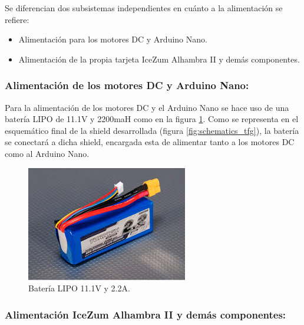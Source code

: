 Se diferencian dos subsistemas independientes en cuánto a la alimentación se refiere:
\begin{itemize}
	\item Alimentación para los motores DC y Arduino Nano.
	\item Alimentación de la propia tarjeta IceZum Alhambra II y demás componentes.
\end{itemize}

\subsubsection{Alimentación de los motores DC y Arduino Nano:}
Para la alimentación de los motores DC y el Arduino Nano se hace uso de una batería LIPO de 11.1V y 2200maH como en la figura \ref{fig:lipo111}. Como se representa en el esquemático final de la shield desarrollada (figura \ref{fig:schematics_tfg}), la batería se conectará a dicha shield, encargada esta de alimentar tanto a los motores DC como al Arduino Nano.

\begin{center}
	\begin{figure}[H]
		\center
		\includegraphics[scale=0.8]{imagenes/Balancing_Robot/LIPO111}
		\caption{Batería LIPO 11.1V y 2.2A. }
		\label{fig:lipo111}
	\end{figure}
\end{center}

\subsubsection{Alimentación IceZum Alhambra II y demás componentes:}

